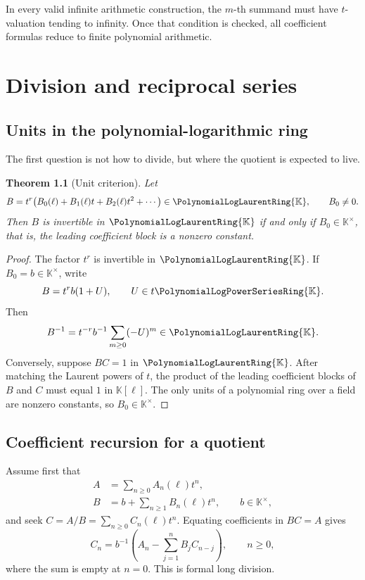 \documentclass[11pt,oneside,openany]{book}
\newtheorem{theorem}{Theorem}[chapter]
\newcommand{\K}{\mathbb{K}}
\newcommand{\Rring}{\PolynomialLogPowerSeriesRing{\K}}
\newcommand{\Pring}{\PolynomialLogLaurentRing{\K}}
\begin{document}
\begin{summarybox}
In every valid infinite arithmetic construction, the \(m\)-th summand must have
\(t\)-valuation tending to infinity.  Once that condition is checked, all
coefficient formulas reduce to finite polynomial arithmetic.
\end{summarybox}

\chapter{Division and reciprocal series}
\label{ch:division}

\section{Units in the polynomial-logarithmic ring}
The first question is not how to divide, but where the quotient is expected to
live.

\begin{theorem}[Unit criterion]\label{thm:unitcriterion}
Let
\[
 B=t^r\bigl(B_0(\ell)+B_1(\ell)t+B_2(\ell)t^2+\cdots\bigr)
 \in\Pring,
 \qquad B_0\neq0.
\]
Then \(B\) is invertible in \(\Pring\) if and only if
\(B_0\in\K^\times\), that is, the leading coefficient block is a nonzero
constant.
\end{theorem}

\begin{proof}
The factor \(t^r\) is invertible in \(\Pring\).  If \(B_0=b\in\K^\times\),
write
\[
 B=t^rb(1+U),
 \qquad U\in t\Rring.
\]
Then
\[
 B^{-1}=t^{-r}b^{-1}\sum_{m\geq0}(-U)^m\in\Pring.
\]
Conversely, suppose \(BC=1\) in \(\Pring\).  After matching the Laurent
powers of \(t\), the product of the leading coefficient blocks of \(B\) and
\(C\) must equal \(1\) in \(\K[\ell]\).  The only units of a polynomial ring
over a field are nonzero constants, so \(B_0\in\K^\times\).
\end{proof}

\section{Coefficient recursion for a quotient}
Assume first that
\begin{align*}
 A&=\sum_{n\geq0}A_n(\ell)t^n,\\
 B&=b+\sum_{n\geq1}B_n(\ell)t^n,
 \qquad b\in\K^\times,
\end{align*}
and seek \(C=A/B=\sum_{n\geq0}C_n(\ell)t^n\).  Equating coefficients in
\(BC=A\) gives
\begin{equation}\label{eq:divisionrecurrence}
 C_n=b^{-1}\left(
 A_n-\sum_{j=1}^{n}B_jC_{n-j}
 \right),
 \qquad n\geq0,
\end{equation}
where the sum is empty at \(n=0\).  This is formal long division.
\end{document}
